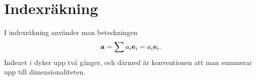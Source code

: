 \section{Indexräkning}

I indexräkning använder man beteckningen
\begin{align*}
	\vb{a} = \sum a_i\vb{e}_i = a_i\vb{e}_i.
\end{align*}
Indexet $i$ dyker upp två gånger, och därmed är konventionen att man summerar upp till dimensionaliteten.